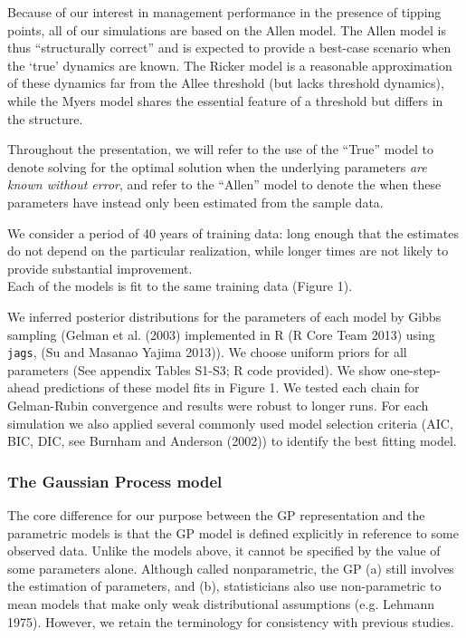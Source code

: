 \documentclass[author-year, 12pt,review]{components/elsarticle} %
\begin{document}
Because of our interest in management performance in the presence of
tipping points, all of our simulations are based on the Allen model. The
Allen model is thus ``structurally correct'' and is expected to provide
a best-case scenario when the `true' dynamics are known. The Ricker
model is a reasonable approximation of these dynamics far from the Allee
threshold (but lacks threshold dynamics), while the Myers model shares
the essential feature of a threshold but differs in the structure.

Throughout the presentation, we will refer to the use of the ``True''
model to denote solving for the optimal solution when the underlying
parameters \emph{are known without error}, and refer to the ``Allen''
model to denote the when these parameters have instead only been
estimated from the sample data.

We consider a period of 40 years of training data: long enough that the
estimates do not depend on the particular realization, while longer
times are not likely to provide substantial improvement.\\Each of the
models is fit to the same training data (Figure 1).

We inferred posterior distributions for the parameters of each model by
Gibbs sampling (Gelman et al. (2003) implemented in R (R Core Team 2013)
using \texttt{jags}, (Su and Masanao Yajima 2013)). We choose uniform
priors for all parameters (See appendix Tables S1-S3; R code provided).
We show one-step-ahead predictions of these model fits in Figure 1. We
tested each chain for Gelman-Rubin convergence and results were robust
to longer runs. For each simulation we also applied several commonly
used model selection criteria (AIC, BIC, DIC, see Burnham and Anderson
(2002)) to identify the best fitting model.

\subsubsection{The Gaussian Process
model}\label{the-gaussian-process-model}

The core difference for our purpose between the GP representation and
the parametric models is that the GP model is defined explicitly in
reference to some observed data. Unlike the models above, it cannot be
specified by the value of some parameters alone. Although called
nonparametric, the GP (a) still involves the estimation of parameters,
and (b), statisticians also use non-parametric to mean models that make
only weak distributional assumptions (e.g. Lehmann 1975). However, we
retain the terminology for consistency with previous studies.
\end{document}
